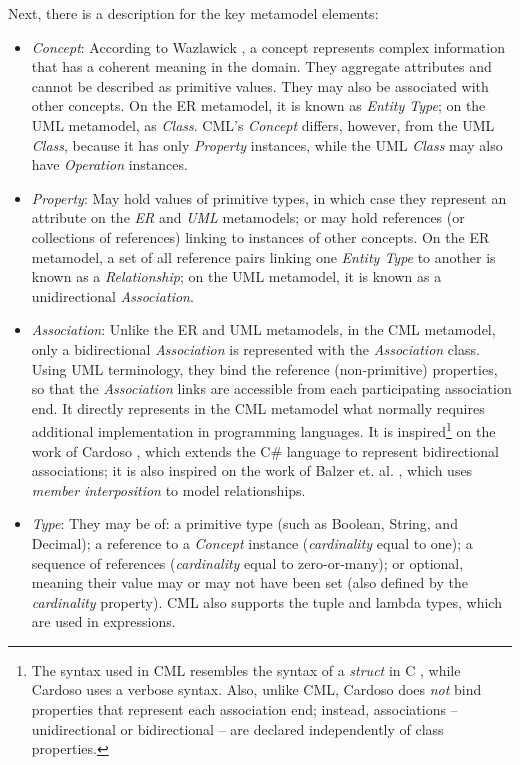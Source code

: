 Next, there is a description for the key metamodel elements:

\begin{itemize}

\item \emph{Concept}: According to Wazlawick \cite{wazlawick},
a concept represents complex information that has a coherent meaning in the domain.
They aggregate attributes and cannot be described as primitive values.
They may also be associated with other concepts.
On the ER metamodel, it is known as \emph{Entity Type};
on the UML metamodel, as \emph{Class}.
CML's \emph{Concept} differs, however, from the UML \emph{Class},
because it has only \emph{Property} instances,
while the UML \emph{Class} may also have \emph{Operation} instances.

\item \emph{Property}: May hold values of primitive types, in which case they represent an attribute on the \emph{ER} and \emph{UML} metamodels;
or may hold references (or collections of references) linking to instances of other concepts.
On the ER metamodel,
a set of all reference pairs linking one \emph{Entity Type} to another is known as a \emph{Relationship};
on the UML metamodel, it is known as a unidirectional \emph{Association}.

\item \emph{Association}: Unlike the ER and UML metamodels, in the CML metamodel,
only a bidirectional \emph{Association} is represented with the \emph{Association} class.
Using UML terminology, they bind the reference (non-primitive) properties,
so that the \emph{Association} links are accessible from each participating association end.
It directly represents in the CML metamodel what normally requires additional implementation in programming languages.
It is inspired\footnote{The syntax used in CML resembles the syntax of a \emph{struct} in C \cite{clang}, while Cardoso \cite{cardoso} uses a verbose syntax. Also, unlike CML, Cardoso does \emph{not} bind properties that represent each association end; instead, associations -- unidirectional or bidirectional -- are declared independently of class properties.} on the work of Cardoso \cite{cardoso}, which extends the C\# language to represent bidirectional associations; it is also inspired on the work of Balzer et. al. \cite{balzer}, which uses \emph{member interposition} to model relationships.

\item \emph{Type}: They may be of: a primitive type (such as Boolean, String, and Decimal); a reference to a \emph{Concept} instance (\emph{cardinality} equal to one); a sequence of references (\emph{cardinality} equal to zero-or-many); or optional, meaning their value may or may not have been set (also defined by the \emph{cardinality} property).
CML also supports the tuple and lambda types, which are used in expressions.


\end{itemize}
